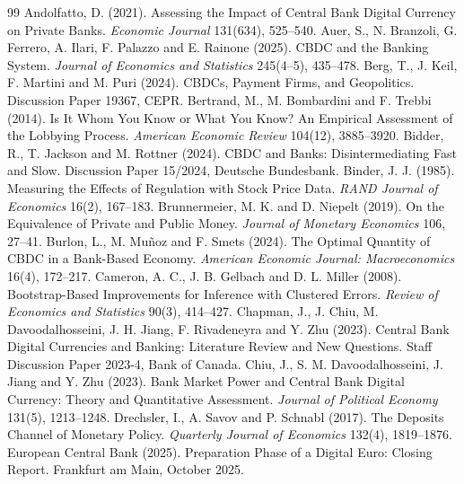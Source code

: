 \documentclass[11pt]{article}
\theoremstyle{plain}\newtheorem{proposition}{Proposition}
\begin{document}
\begin{thebibliography}{99}
 Andolfatto, D. (2021). Assessing the Impact of Central Bank Digital Currency on Private Banks. \emph{Economic Journal} 131(634), 525--540.
 Auer, S., N. Branzoli, G. Ferrero, A. Ilari, F. Palazzo and E. Rainone (2025). CBDC and the Banking System. \emph{Journal of Economics and Statistics} 245(4--5), 435--478.
 Berg, T., J. Keil, F. Martini and M. Puri (2024). CBDCs, Payment Firms, and Geopolitics. Discussion Paper 19367, CEPR.
 Bertrand, M., M. Bombardini and F. Trebbi (2014). Is It Whom You Know or What You Know? An Empirical Assessment of the Lobbying Process. \emph{American Economic Review} 104(12), 3885--3920.
 Bidder, R., T. Jackson and M. Rottner (2024). CBDC and Banks: Disintermediating Fast and Slow. Discussion Paper 15/2024, Deutsche Bundesbank.
 Binder, J. J. (1985). Measuring the Effects of Regulation with Stock Price Data. \emph{RAND Journal of Economics} 16(2), 167--183.
 Brunnermeier, M. K. and D. Niepelt (2019). On the Equivalence of Private and Public Money. \emph{Journal of Monetary Economics} 106, 27--41.
 Burlon, L., M. Muñoz and F. Smets (2024). The Optimal Quantity of CBDC in a Bank-Based Economy. \emph{American Economic Journal: Macroeconomics} 16(4), 172--217.
 Cameron, A. C., J. B. Gelbach and D. L. Miller (2008). Bootstrap-Based Improvements for Inference with Clustered Errors. \emph{Review of Economics and Statistics} 90(3), 414--427.
 Chapman, J., J. Chiu, M. Davoodalhosseini, J. H. Jiang, F. Rivadeneyra and Y. Zhu (2023). Central Bank Digital Currencies and Banking: Literature Review and New Questions. Staff Discussion Paper 2023-4, Bank of Canada.
 Chiu, J., S. M. Davoodalhosseini, J. Jiang and Y. Zhu (2023). Bank Market Power and Central Bank Digital Currency: Theory and Quantitative Assessment. \emph{Journal of Political Economy} 131(5), 1213--1248.
 Drechsler, I., A. Savov and P. Schnabl (2017). The Deposits Channel of Monetary Policy. \emph{Quarterly Journal of Economics} 132(4), 1819--1876.
 European Central Bank (2025). Preparation Phase of a Digital Euro: Closing Report. Frankfurt am Main, October 2025.

\end{thebibliography}
\end{document}
